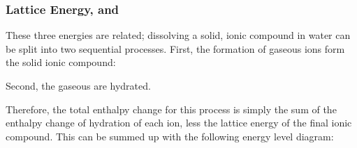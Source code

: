 

		\subsubsection{Lattice Energy,  and }

			These three energies are related; dissolving a solid, ionic compound in water can be split into two sequential processes.
			First, the formation of gaseous ions form the solid ionic compound:


			Second, the gaseous are hydrated.


			Therefore, the total enthalpy change for this process is simply the sum of the enthalpy change of hydration of each ion, less
			the lattice energy of the final ionic compound. This can be summed up with the following energy level diagram:






































































